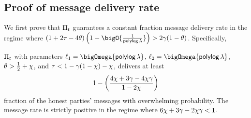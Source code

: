 \documentclass[runningheads,a4paper]{llncs}
\begin{document}

 
\subsection{Proof of message delivery rate}
We first prove that $\Pi_t$ guarantees a constant fraction message delivery rate in the regime where 
$(1 + 2\tau - 4\theta)\left(1-\bigO{\frac{1}{\polylog \thinspace\secpar}}\right) > 2\drop(1-\theta)$. Specifically, 

\iffalse 
\begin{theorem} \label{thm:messagedelivery} 
$\Pi_t$ with parameters
$\ell_1 = \bigOmega{\polylog\thinspace\secpar}$, $\ell_2 = \bigOmega{\polylog\thinspace\secpar}$, 
$\theta > \frac{1}{2} + \chi$, and 
$\tau < 1 - \gamma(1-\chi) - \chi$, 
delivers at least 
\[ 
1 - \left( \frac{4\chi + 3\gamma - 4\chi\gamma}{1-2\chi} \right)
\] 
fraction of the honest parties' messages with overwhelming probability. 
The message rate is strictly positive in the regime where $6\chi + 3\gamma - 2\chi\gamma < 1$. 
\end{theorem}
\end{document}
